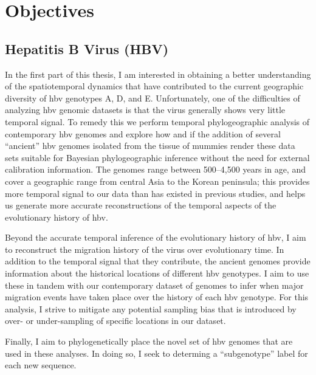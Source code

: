 \chapter{Objectives}
\label{ch:objectives}

\section{Hepatitis B Virus (HBV)}

In the first part of this thesis, I am interested in obtaining a better understanding of the spatiotemporal dynamics that have contributed to the current geographic diversity of \gls{hbv} genotypes A, D, and E.
Unfortunately, one of the difficulties of analyzing \gls{hbv} genomic datasets is that the virus generally shows very little temporal signal.
To remedy this we perform temporal phylogeographic analysis of contemporary \gls{hbv} genomes and explore how and if the addition of several ``ancient'' \gls{hbv} genomes isolated from the tissue of mummies \cite{muhlemann2018ancient, ross2018paradox} render these data sets suitable for Bayesian phylogeographic inference without the need for external calibration information.
The genomes range between 500--4,500 years in age, and cover a geographic range from central Asia to the Korean peninsula; this provides more temporal signal to our data than has existed in previous studies, and helps us generate more accurate reconstructions of the temporal aspects of the evolutionary history of \gls{hbv}.

Beyond the accurate temporal inference of the evolutionary history of \gls{hbv}, I aim to reconstruct the migration history of the virus over evolutionary time.
In addition to the temporal signal that they contribute, the ancient genomes provide information about the historical locations of different \gls{hbv} genotypes.
I aim to use these in tandem with our contemporary dataset of genomes to infer when major migration events have taken place over the history of each \gls{hbv} genotype.
For this analysis, I strive to mitigate any potential sampling bias that is introduced by over- or under-sampling of specific locations in our dataset.

Finally, I aim to phylogenetically place the novel set of \gls{hbv} genomes that are used in these analyses.
In doing so, I seek to determing a ``subgenotype'' label for each new sequence. %

